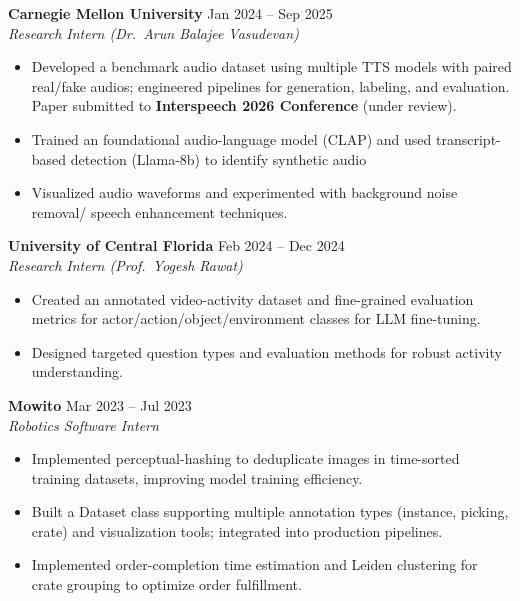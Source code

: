 \documentclass[10pt]{article}
\begin{document}
\vspace{-1mm}
\textbf{Carnegie Mellon University} \hfill Jan 2024 -- Sep 2025\\
\emph{Research Intern (Dr.\ Arun Balajee Vasudevan)}
\vspace{-2mm}
\begin{itemize}[leftmargin=*,noitemsep,topsep=1pt]
  \item Developed a benchmark audio dataset using multiple TTS models with paired real/fake audios; engineered pipelines for generation, labeling, and evaluation. Paper submitted to \textbf{Interspeech 2026 Conference} (under review).
  \item Trained an foundational audio-language model (CLAP) and used transcript-based detection (Llama-8b) to identify synthetic audio
  \item Visualized audio waveforms and experimented with background noise removal/ speech enhancement techniques.
\end{itemize}

\vspace{-1mm}
\textbf{University of Central Florida} \hfill Feb 2024 -- Dec 2024\\
\emph{Research Intern (Prof.\ Yogesh Rawat)}
\vspace{-2mm}
\begin{itemize}[leftmargin=*,noitemsep,topsep=1pt]
  \item Created an annotated video-activity dataset and fine-grained evaluation metrics for actor/action/object/environment classes for LLM fine-tuning.
  \item Designed targeted question types and evaluation methods for robust activity understanding.
\end{itemize}

\vspace{-1mm}
\textbf{Mowito} \hfill Mar 2023 -- Jul 2023\\
\emph{Robotics Software Intern}
\vspace{-2mm}
\begin{itemize}[leftmargin=*,noitemsep,topsep=1pt]
  \item Implemented perceptual-hashing to deduplicate images in time-sorted training datasets, improving model training efficiency.
  \item Built a Dataset class supporting multiple annotation types (instance, picking, crate) and visualization tools; integrated into production pipelines.
  \item Implemented order-completion time estimation and Leiden clustering for crate grouping to optimize order fulfillment.
\end{itemize}
\end{document}
